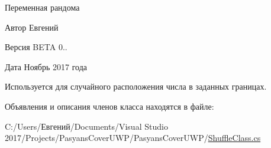 Переменная рандома 

\begin{DoxyAuthor}{Автор}
Евгений 
\end{DoxyAuthor}
\begin{DoxyVersion}{Версия}
B\+E\+TA 0.. 
\end{DoxyVersion}
\begin{DoxyDate}{Дата}
Ноябрь 2017 года
\end{DoxyDate}
Используется для случайного расположения числа в заданных границах. 

Объявления и описания членов класса находятся в файле\+:\begin{DoxyCompactItemize}
\item 
C\+:/\+Users/Евгений/\+Documents/\+Visual Studio 2017/\+Projects/\+Pasyans\+Cover\+U\+W\+P/\+Pasyans\+Cover\+U\+W\+P/\hyperlink{_shuffle_class_8cs}{Shuffle\+Class.\+cs}\end{DoxyCompactItemize}
